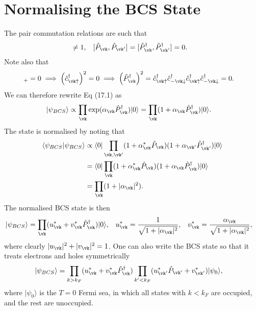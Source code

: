 \documentclass[a4paper, 11pt, normalem]{report}
\begin{document}
\section{Normalising the BCS State}
The pair commutation relations are such that
\begin{align}
    [\hat{P}_{\vk},\hat{P}^\dagger_{\vk}]&\neq1, & [\hat{P}_{\vk},\hat{P}_{\vk'}] &= [\hat{P}_{\vk}^\dagger,\hat{P}_{\vk'}^\dagger] = 0.
\end{align}
Note also that
\begin{align}
    [\hat{c}_{\vk\uparrow}^\dagger,\hat{c}_{\vk\uparrow}^\dagger]_+ &= 0 \implies \left(\hat{c}_{\vk\uparrow}^\dagger\right)^2 = 0 \implies \left(\hat{P}_{\vk}^\dagger\right)^2 = \hat{c}_{\vk\uparrow}^\dagger\hat{c}_{-\vk\downarrow}^\dagger\hat{c}_{\vk\uparrow}^\dagger\hat{c}_{-\vk\downarrow}^\dagger = 0.
\end{align}
We can therefore rewrite Eq (17.1) as
\begin{align}
    |\psi_{BCS}\rangle &\propto \prod_{\vk}\exp(\alpha_{\vk}\hat{P}_{\vk}^\dagger)|0\rangle = \prod_{\vk}(1+\alpha_{\vk}\hat{P}_{\vk}^\dagger)|0\rangle.
\end{align}
The state is normalised by noting that
\begin{align}
    \begin{split}
        \langle\psi_{BCS}|\psi_{BCS}\rangle &\propto \langle0|\prod_{\vk,\vk'}(1+\alpha_{\vk}^*\hat{P}_{\vk})(1+\alpha_{\vk'}\hat{P}_{\vk'}^\dagger)|0\rangle \\
                                            &= \langle0|\prod_{\vk}(1+\alpha_{\vk}^*\hat{P}_{\vk})(1+\alpha_{\vk}\hat{P}_{\vk}^\dagger)|0\rangle \\
                                            &= \prod_{\vk}(1+|\alpha_{\vk}|^2).
    \end{split}
\end{align}
The normalised BCS state is then
\begin{align}
    |\psi_{BCS}\rangle &= \prod_{\vk}(u_{\vk}^*+v_{\vk}^*\hat{P}_{\vk}^\dagger)|0\rangle, & u_{\vk}^* &= \frac{1}{\sqrt{1+|\alpha_{\vk}|^2}}, & v_{\vk}^* &= \frac{\alpha_{\vk}}{\sqrt{1+|\alpha_{\vk}|^2}},
\end{align}
where clearly $|u_{\vk}|^2+|v_{\vk}|^2=1$.
One can also write the BCS state so that it treats electrons and holes symmetrically
\begin{align}
    |\psi_{BCS}\rangle &= \prod_{k>k_F} (u_{\vk}^*+v_{\vk}^*\hat{P}_{\vk}^\dagger)\prod_{k'<k_F}(u_{\vk'}^*\hat{P}_{\vk'}+v_{\vk'}^*)|\psi_0\rangle,
\end{align}
where $|\psi_0\rangle$ is the $T=0$ Fermi sea, in which all states with $k<k_F$ are occupied, and the rest are unoccupied.
\end{document}
